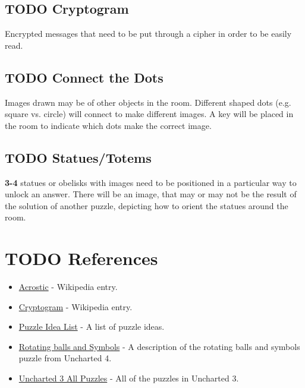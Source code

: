 \documentclass[11pt]{article}
\begin{document}
\subsection{{\bfseries\sffamily TODO} Cryptogram}
\label{sec:orgdb37ba5}
Encrypted messages that need to be put through a cipher in order to be easily read.

\subsection{{\bfseries\sffamily TODO} Connect the Dots}
\label{sec:org4797032}
Images drawn may be of other objects in the room. Different shaped dots (e.g. square vs. circle) will connect to make different images. A key will be placed in the room to indicate which dots make the correct image.

\subsection{{\bfseries\sffamily TODO} Statues/Totems}
\label{sec:org17afa1e}
\textbf{3-4} statues or obelisks with images need to be positioned in a particular way to unlock an answer. There will be an image, that may or may not be the result of the solution of another puzzle, depicting how to orient the statues around the room.

\section{{\bfseries\sffamily TODO} References}
\label{sec:orgf26ba3a}
\begin{itemize}
\item \href{https://en.wikipedia.org/wiki/Acrostic\_(puzzle)}{Acrostic} - Wikipedia entry.
\item \href{https://en.wikipedia.org/wiki/Cryptogram}{Cryptogram} - Wikipedia entry.
\item \href{http://www.bloodandbones.com/ph12sim/types.htm}{Puzzle Idea List} - A list of puzzle ideas.
\item \href{http://www.accelerated-ideas.com/news/uncharted-4-chapter-1-2-puzzle-solution-rotating-balls.aspx}{Rotating balls and Symbols} - A description of the rotating balls and symbols puzzle from Uncharted 4.
\item \href{http://www.gameshampoo.com/magazine/articles/24/uncharted-3-all-puzzle-solutions.html}{Uncharted 3 All Puzzles} - All of the puzzles in Uncharted 3.
\end{itemize}
\end{document}
